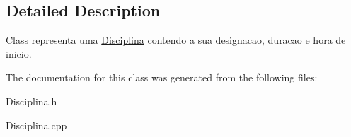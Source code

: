 \subsection{Detailed Description}
Class representa uma \hyperlink{class_disciplina}{Disciplina} contendo a sua designacao, duracao e hora de inicio. 

The documentation for this class was generated from the following files\-:\begin{DoxyCompactItemize}
\item 
Disciplina.\-h\item 
Disciplina.\-cpp\end{DoxyCompactItemize}
